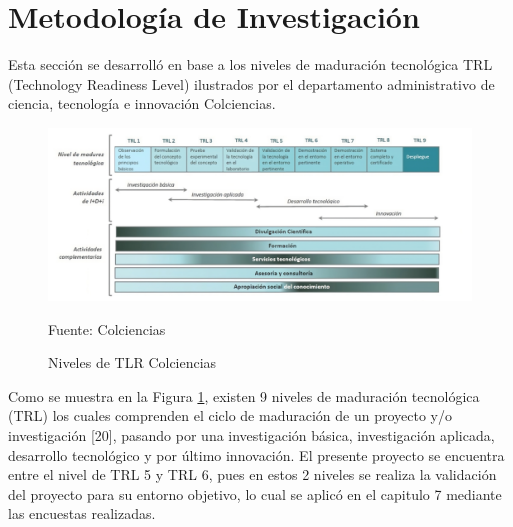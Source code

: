 \section{Metodología de Investigación}

Esta sección se desarrolló en base a los niveles de maduración tecnológica TRL (Technology Readiness Level) ilustrados por el departamento administrativo de ciencia, tecnología e innovación Colciencias.
  

\begin{figure}[H]
    \centering
    \includegraphics[width=1\linewidth]{Imagenes/Niveles_de_maduracion_tecnologica-transformed (1).png}
    \caption{Niveles de TLR Colciencias}
    Fuente: Colciencias \cite{colciencias2018trl}
    \label{fig:tlr}
\end{figure}
Como se muestra en la Figura \ref{fig:tlr}, existen 9 niveles de maduración tecnológica (TRL)  los cuales comprenden el ciclo de maduración de un proyecto y/o investigación [20], pasando por una investigación básica, investigación aplicada, desarrollo tecnológico y por último innovación. El presente proyecto se encuentra entre el nivel de TRL 5 y TRL 6, pues en estos 2 niveles se realiza la validación del proyecto para su entorno objetivo, lo cual se aplicó en el capitulo 7 mediante las encuestas realizadas.